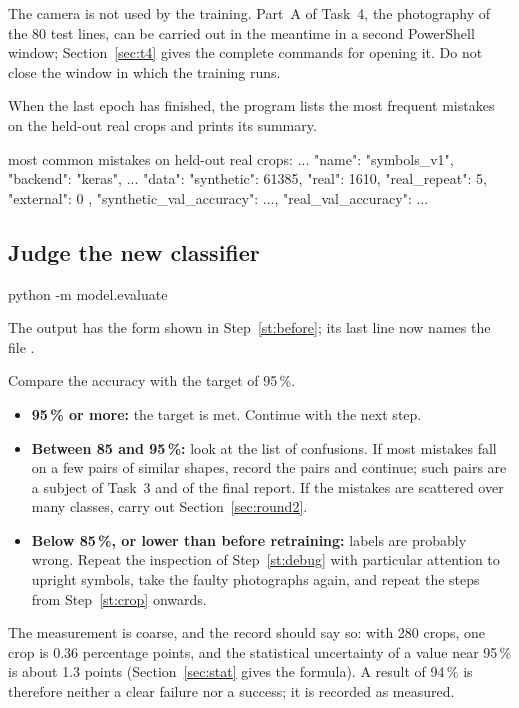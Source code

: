 \begin{note}
The camera is not used by the training. Part~A of Task~4, the photography of the 80 test lines,
can be carried out in the meantime in a second PowerShell window; Section~\ref{sec:t4} gives the
complete commands for opening it. Do not close the window in which the training runs.
\end{note}

When the last epoch has finished, the program lists the most frequent mistakes on the held-out
real crops and prints its summary.
\begin{out}
most common mistakes on held-out real crops:
  ...
{
 "name": "symbols_v1",
 "backend": "keras",
 ...
 "data": {
  "synthetic": 61385,
  "real": 1610,
  "real_repeat": 5,
  "external": 0
 },
 "synthetic_val_accuracy": ...,
 "real_val_accuracy": ...
}
\end{out}

\subsection{Judge the new classifier}

\label{st:after}
\begin{ps}
python -m model.evaluate
\end{ps}
The output has the form shown in Step~\ref{st:before}; its last line now names the file
.

\label{st:decide2}
Compare the accuracy with the target of 95\,\%.
\begin{itemize}
\item \textbf{95\,\% or more:} the target is met. Continue with the next step.
\item \textbf{Between 85 and 95\,\%:} look at the list of confusions. If most mistakes fall on
  a few pairs of similar shapes, record the pairs and continue; such pairs are a subject of
  Task~3 and of the final report. If the mistakes are scattered over many classes, carry out
  Section~\ref{sec:round2}.
\item \textbf{Below 85\,\%, or lower than before retraining:} labels are probably wrong.
  Repeat the inspection of Step~\ref{st:debug} with particular attention to upright symbols,
  take the faulty photographs again, and repeat the steps from Step~\ref{st:crop} onwards.
\end{itemize}
The measurement is coarse, and the record should say so: with 280 crops, one crop is 0.36
percentage points, and the statistical uncertainty of a value near 95\,\% is about 1.3 points
(Section~\ref{sec:stat} gives the formula). A result of 94\,\% is therefore neither a clear
failure nor a success; it is recorded as measured.

